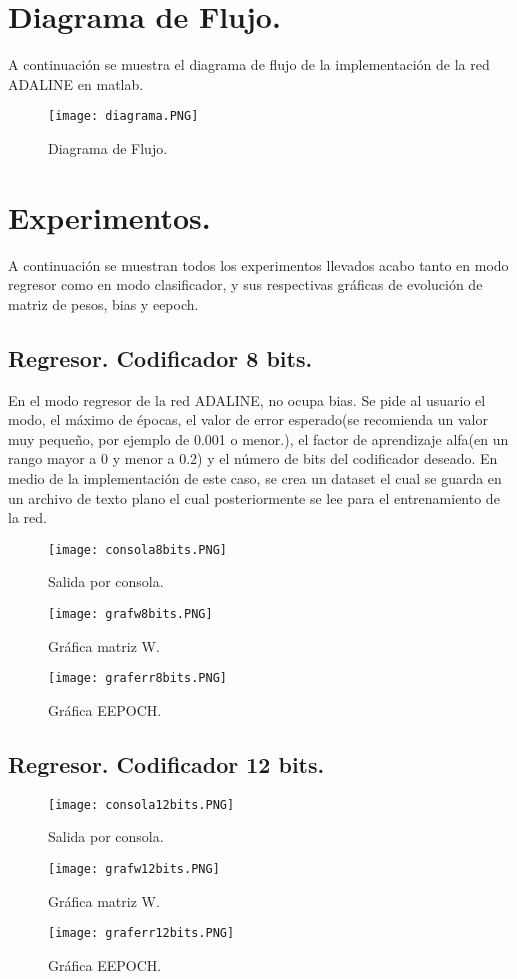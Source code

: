 \documentclass[]{article}
\begin{document}
	\section{Diagrama de Flujo.}
	A continuación se muestra el diagrama de flujo de la implementación de la red ADALINE en matlab.
	\begin{figure}[H]
		\centering
		\texttt{[image: diagrama.PNG]}
		\caption{Diagrama de Flujo.}
	\end{figure}
\newpage
	\section{Experimentos.}
	A continuación se muestran todos los experimentos llevados acabo tanto en modo regresor como en modo clasificador, y sus respectivas gráficas de evolución de matriz de pesos, bias y eepoch.
	\subsection{Regresor. Codificador 8 bits.}
	En el modo regresor de la red ADALINE, no ocupa bias.
	Se pide al usuario el modo, el máximo de épocas, el valor de error esperado(se recomienda un valor muy pequeño, por ejemplo de 0.001 o menor.), el factor de aprendizaje alfa(en un rango mayor a 0 y menor a 0.2) y el número de bits del codificador deseado. En medio de la implementación de este caso, se crea un dataset el cual se guarda en un archivo de texto plano el cual posteriormente se lee para el entrenamiento de la red.
	\begin{figure}[H]
		\centering
		\texttt{[image: consola8bits.PNG]}
		\caption{Salida por consola.}
	\end{figure}
\begin{figure}[H]
	\centering
	\texttt{[image: grafw8bits.PNG]}
	\caption{Gráfica matriz W.}
\end{figure}
\begin{figure}[H]
	\centering
	\texttt{[image: graferr8bits.PNG]}
	\caption{Gráfica EEPOCH.}
\end{figure}
\subsection{Regresor. Codificador 12 bits.}

\begin{figure}[H]
	\centering
	\texttt{[image: consola12bits.PNG]}
	\caption{Salida por consola.}
\end{figure}
\begin{figure}[H]
	\centering
	\texttt{[image: grafw12bits.PNG]}
	\caption{Gráfica matriz W.}
\end{figure}
\begin{figure}[H]
	\centering
	\texttt{[image: graferr12bits.PNG]}
	\caption{Gráfica EEPOCH.}
\end{figure}
\newpage
\end{document}
